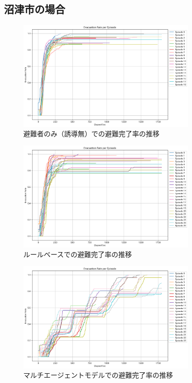 \subsection{沼津市の場合}

\begin{figure}[H]
  \centering
  \includegraphics[width=0.8\textwidth]{Figures/Numazu-EvaOnly-ERE.png}
  \caption{避難者のみ（誘導無）での避難完了率の推移}
\end{figure}

\begin{figure}[H] 
  \centering 
  \includegraphics[width=0.8\textwidth]{Figures/Numazu-RuleModel-ERE.png}
  \caption{ルールベースでの避難完了率の推移}

\end{figure}

\begin{figure}[H] 
  \centering 
  \includegraphics[width=0.8\textwidth]{Figures/Numazu-AgentModel-ERE.png}
  \caption{マルチエージェントモデルでの避難完了率の推移}
\end{figure}


